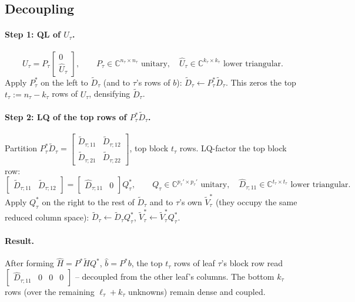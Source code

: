 \documentclass[11pt]{article}
\begin{document}
\subsection{Decoupling}
\label{subsec:decoupling}

\paragraph{Step 1: QL of $U_\tau$.}
\[
U_\tau = P_\tau\begin{bmatrix}0\\ \hat U_\tau\end{bmatrix},\qquad
P_\tau\in\mathbb{C}^{n_\tau\times n_\tau}\text{ unitary},\quad
\hat U_\tau\in\mathbb{C}^{k_\tau\times k_\tau}\text{ lower triangular}.
\]
Apply $P_\tau^*$ on the left to $\tilde D_\tau$ (and to $\tau$'s rows of $b$):
$\tilde D_\tau\leftarrow P_\tau^*\tilde D_\tau$. This zeros the top $t_\tau:=n_\tau-k_\tau$
rows of $U_\tau$, densifying $\tilde D_\tau$.

\paragraph{Step 2: LQ of the top rows of $P_\tau^*\tilde D_\tau$.}
Partition $P_\tau^*\tilde D_\tau=\begin{bmatrix}\tilde D_{\tau;11} & \tilde D_{\tau;12}\\ \tilde D_{\tau;21}&\tilde D_{\tau;22}\end{bmatrix}$,
top block $t_\tau$ rows. LQ-factor the top block row:
\[
\begin{bmatrix}\tilde D_{\tau;11}&\tilde D_{\tau;12}\end{bmatrix}
=\begin{bmatrix}\hat D_{\tau;11}&0\end{bmatrix}Q_\tau^*,
\qquad
Q_\tau\in\mathbb{C}^{p_\tau'\times p_\tau'}\text{ unitary},\quad
\hat D_{\tau;11}\in\mathbb{C}^{t_\tau\times t_\tau}\text{ lower triangular}.
\]
Apply $Q_\tau^*$ on the right to the rest of $\tilde D_\tau$ and to $\tau$'s own
$\tilde V_\tau^*$ (they occupy the same reduced column space):
$\tilde D_\tau\leftarrow \tilde D_\tau Q_\tau^*$, $\tilde V_\tau^*\leftarrow \tilde V_\tau^*Q_\tau^*$.

\paragraph{Result.}
After forming $\hat H=P^*\tilde HQ^*$, $\hat b=P^*b$, the top $t_\tau$ rows of
leaf $\tau$'s block row read $\begin{bmatrix}\hat D_{\tau;11}&0&0&0\end{bmatrix}$
-- decoupled from the other leaf's columns. The bottom $k_\tau$ rows (over the
remaining $\ell_\tau+k_\tau$ unknowns) remain dense and coupled.
\end{document}
